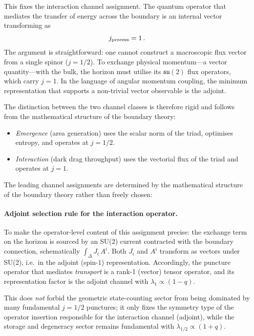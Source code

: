 \documentclass[aps,prd,twocolumn,10pt,superscriptaddress,nofootinbib]{revtex4-2}
\begin{document}
This fixes the interaction channel assignment.  The quantum
operator that mediates the transfer of energy across the boundary
is an internal vector transforming as
\begin{equation}
j_{\rm process} = 1\,.
\label{eq:j_process}
\end{equation}
The argument is straightforward: one cannot construct a macroscopic
flux vector from a single spinor ($j = 1/2$).  To exchange
physical momentum---a vector quantity---with the bulk, the horizon
must utilise its $\mathfrak{su}(2)$ flux operators, which carry
$j = 1$.  In the language of angular momentum coupling, the
minimum representation that supports a non-trivial vector
observable is the adjoint.

The distinction between the two channel classes is therefore rigid
and follows from the mathematical structure of the boundary theory:
\begin{itemize}
\item \emph{Emergence} (area generation) uses the scalar norm of
  the triad, optimises entropy, and operates at $j = 1/2$.
\item \emph{Interaction} (dark drag throughput) uses the vectorial
  flux of the triad and operates at $j = 1$.
\end{itemize}
The leading channel assignments are determined by the mathematical
structure of the boundary theory rather than freely chosen:

\paragraph{Adjoint selection rule for the interaction operator.}

To make the operator-level content of this assignment precise:
the exchange term on the horizon is sourced by an SU(2) current
contracted with the boundary connection, schematically
$\int_\Delta J_i\,A^i$.  Both $J_i$ and $A^i$ transform as
vectors under SU(2), i.e.\ in the adjoint (spin-$1$)
representation.  Accordingly, the puncture operator that mediates
\emph{transport} is a rank-1 (vector) tensor operator, and its
representation factor is the adjoint channel with
$\lambda_1 \propto (1-q)$.

This does \emph{not} forbid the geometric state-counting sector
from being dominated by many fundamental $j = 1/2$ punctures; it
only fixes the symmetry type of the operator insertion responsible
for the interaction channel (adjoint), while the storage and
degeneracy sector remains fundamental with
$\lambda_{1/2} \propto (1+q)$.
\end{document}
